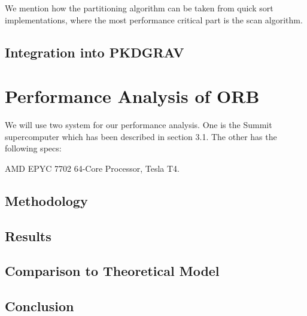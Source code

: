\documentclass[]{article}
\begin{document}
We mention how the partitioning algorithm can be taken from quick sort implementations, where the most performance critical part is the scan algorithm. 
\newpage
\subsection{Integration into PKDGRAV}



\newpage
\section{Performance Analysis of ORB}

We will use two system for our performance analysis. One is the Summit supercomputer which has been described in section 3.1. The other has the following specs:


AMD EPYC 7702 64-Core Processor, Tesla T4.


\subsection{Methodology}

\subsection{Results}


\begin{comment}
	\begin{figure}[H]
		\begin{center}
			\begin{tikzpicture}
				\begin{axis}[
					height=10cm,width=13cm, 
					title={Measured Performance with $d = 1024$},
					xlabel={Particle Count},
					ylabel={Execution Time (ms)},
					]
					
					\foreach \i in {0,...,3}{
						\pgfmathsetmacro\suffix{int(pow(2,\i))};
						
						\addplot +[] 
						table [col sep=comma, x=N, y=time] 
						{../../code/out/measurements\suffix.csv};
						
						\addlegendentryexpanded{\# $\suffix$};
						
					}	
				\end{axis}
			\end{tikzpicture}
		\end{center}
	\end{figure}
\end{comment}


\subsection{Comparison to Theoretical Model}


\subsection{Conclusion}


%

\end{document}
